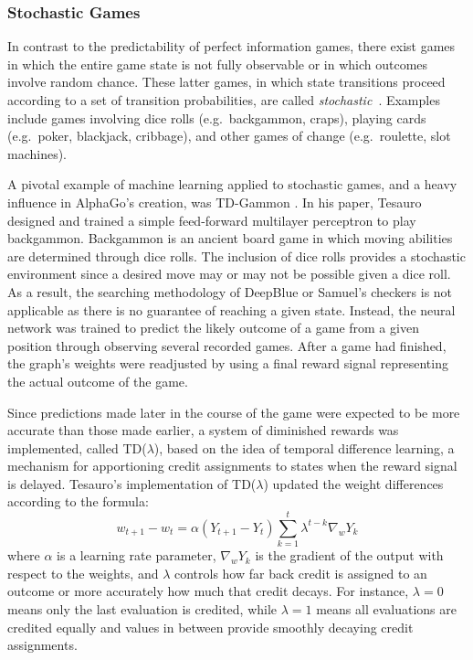 

\subsubsection*{Stochastic Games}


In contrast to the predictability of perfect information games,
there exist games in which the entire game state is not fully observable
or in which outcomes involve random chance.
%
These latter games,
in which state transitions
proceed according to a set of transition probabilities,
are called \textit{stochastic}~\cite{stochastic_games}.
%
Examples include games involving
dice rolls (e.g.\ backgammon, craps),
playing cards (e.g.\ poker, blackjack, cribbage),
and other games of change (e.g.\ roulette, slot machines).


A pivotal example of machine learning applied to stochastic games,
and a heavy influence in AlphaGo's creation,
was TD-Gammon
\cite{tdgammon}.
%
In his paper,
Tesauro designed and trained a simple feed-forward multilayer perceptron to play 
backgammon.
%
Backgammon is an ancient board game in which moving abilities are determined
through dice rolls.
%
The inclusion of dice rolls provides a stochastic environment since
a desired move may or may not be possible given a dice roll.
%
As a result,
the searching methodology of DeepBlue or Samuel's checkers is not applicable
as there is no guarantee of reaching a given state.
%
Instead,
the neural network was trained to predict the likely outcome of a game from a
given position
through observing several recorded games.
%
After a game had finished,
the graph's weights were readjusted by using a final reward signal representing
the actual outcome of the game.

Since predictions made later in the course of the game were expected to be more
accurate than those made earlier,
a system of diminished rewards was implemented,
called TD($\lambda$),
based on the idea of temporal difference learning,
a mechanism for apportioning credit assignments to states when the reward
signal is delayed.
%
Tesauro's implementation of TD($\lambda$) updated the weight differences according to the formula:
\[
	w_{t+1} - w_t =
		\alpha (Y_{t+1}-Y_t)
		\sum_{k=1}^t {\lambda^{t-k} \nabla_w Y_k}
\]
where $\alpha$ is a learning rate parameter,
$\nabla_w Y_k$ is the gradient of the output with respect to the weights,
and $\lambda$ controls how far back credit is assigned to an outcome
or more accurately how much that credit decays.
%
For instance,
$\lambda=0$ means only the last evaluation is credited,
while $\lambda=1$ means all evaluations are credited equally
and values in between provide smoothly decaying credit assignments.

